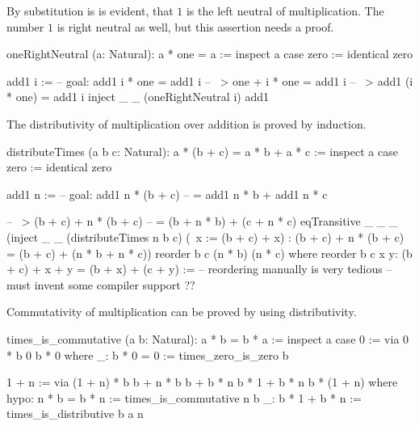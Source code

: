 By substitution is is evident, that $1$ is the left neutral of
multiplication. The number $1$ is right neutral as well, but this assertion
needs a proof.

\begin{alba}
    oneRightNeutral (a: Natural): a * one = a :=
        inspect a case
            zero :=
                identical zero

            add1 i :=
                -- goal:  add1 i * one = add1 i
                -- ~>     one + i * one = add1 i
                -- ~>     add1 (i * one) = add1 i
                inject _ _
                    (oneRightNeutral i)
                    add1
\end{alba}


The distributivity of multiplication over addition is proved by induction.
%
\begin{alba}
    distributeTimes (a b c: Natural): a * (b + c) = a * b + a * c :=
        inspect a case
            zero :=
                identical zero

            add1 n :=
                -- goal:  add1 n * (b + c)
                --        = add1 n * b + add1 n * c

                -- ~>     (b + c) + n * (b + c)
                --        = (b + n * b) + (c + n * c)
                eqTransitive _ _ _
                    (inject _ _
                        (distributeTimes n b c)
                        (\ x := (b + c) + x)
                        : (b + c) + n * (b + c) = (b + c) + (n * b + n * c))
                    reorder b c (n * b) (n * c)
                where
                    reorder b c x y: (b + c) + x + y = (b + x) + (c + y)
                    :=
                        -- reordering manually is very tedious
                        -- must invent some compiler support
                        ??
\end{alba}

Commutativity of multiplication can be proved by using distributivity.

\begin{alba}
  times_is_commutative (a b: Natural): a * b = b * a :=
    inspect a case
      0 :=
       via 0 * b
           0
           b * 0
       where
         _: b * 0 = 0 := times_zero_is_zero b

      1 + n :=
        via
          (1 + n) * b
          b + n * b
          b + b * n
          b * 1 + b * n
          b * (1 + n)
        where
          hypo: n * b = b * n := times_is_commutative n b
          _: b * 1 + b * n := times_is_distributive b a n
\end{alba}










